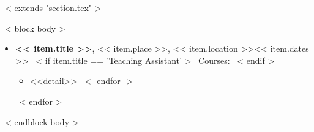 ~< extends "section.tex" >~

~< block body >~
  \begin{itemize}
    ~< for item in items >~
      \item \textbf{<< item.title >>}, << item.place >>, << item.location >>\hfill << item.dates >>
      ~< if item.title == 'Teaching Assistant' >~
        Courses:
      ~< endif >~
      \vspace{1.2mm}
        \begin{itemize}
          ~< for detail in item.details ->~
            \item <<detail>>
            \vspace{1.2mm}
          ~<- endfor ->~
        \end{itemize}
      \vspace{2.5mm}
    ~< endfor >~
  \end{itemize}
~< endblock body >~
